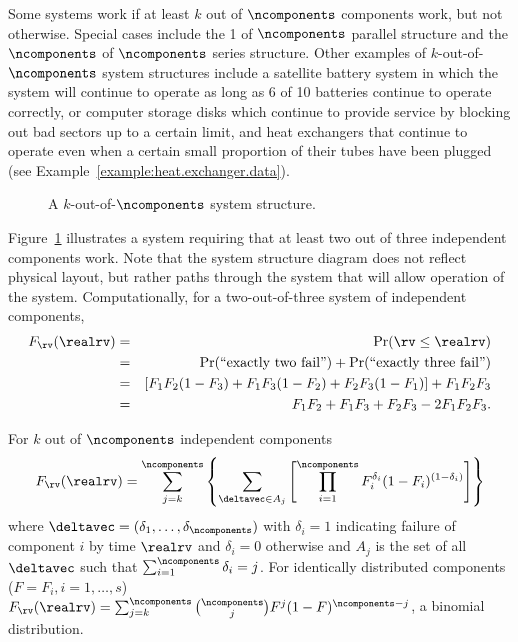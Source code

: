 Some systems work if at least $k$ out of $\ncomponents$ components
work, but not otherwise. Special cases include the 1 of $\ncomponents$
parallel structure and the $\ncomponents$ of $\ncomponents$ series
structure.  Other examples of $k$-out-of-$\ncomponents$ system structures
include a satellite battery system in which the system will continue
to operate as long as 6 of 10 batteries continue to operate correctly,
or computer storage disks which continue to provide service by
blocking out bad sectors up to a certain limit, and heat exchangers
that continue to operate even when a certain small proportion of their tubes
have been plugged (see Example~\ref{example:heat.exchanger.data}).

\begin{figure}
\caption{A $k$-out-of-$\ncomponents$ system structure.}
\label{figure:system.kofnfig.ps}
\end{figure}
Figure~\ref{figure:system.kofnfig.ps} illustrates
a system requiring that at least two out of three independent
components work.  Note that the system structure diagram does not
reflect physical layout, but rather paths through the system that will
allow operation of the system. Computationally, for a two-out-of-three
system of independent components,
\begin{eqnarray*}
F_{\rv}(\realrv)&=&\Pr( \rv \le \realrv)
\\
&=&
  \Pr(\mbox{``exactly two fail''} )
 +\Pr(\mbox{``exactly three fail''})
\\
&=&
 [F_{1} F_{2}(1-F_{3})
+F_{1} F_{3}(1-F_{2})
+F_{2} F_{3}(1-F_{1})]
+F_{1} F_{2}F_{3}
\\
&=&
F_{1} F_{2}
+F_{1} F_{3}
+F_{2} F_{3}
-2F_{1} F_{2}F_{3}.
\end{eqnarray*}

For $k$ out of $\ncomponents$ independent components
\begin{equation}
\label{equation:system.kofsfig}
F_{\rv}(\realrv)=
\sum_{j=k}^{\ncomponents}
\left \{
\sum_{\deltavec \in A_{j} } \left [
\prod_{i=1}^{\ncomponents}
F_{i}^{\delta_{i}}(1-F_{i})^{(1-\delta_{i})}\right ]\right \}
\end{equation}
where $\deltavec =
(\delta_{1}, \ldots, \delta_{\ncomponents})$ with
$\delta_{i}=1$ indicating failure of
component $i$ by time $\realrv$ and 
$\delta_{i}=0$ otherwise and $A_{j}$ is the set of all
$\deltavec$
such that $\sum_{i=1}^{\ncomponents} \delta_{i}=j$.
For identically distributed components ($F=F_{i}, i=1, \dots,s$)
$F_{\rv}(\realrv)=\sum_{j=k}^{\ncomponents} {\ncomponents \choose j}
F^{j}(1-F)^{\ncomponents-j}$, a binomial distribution.

